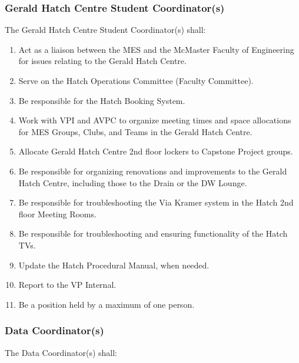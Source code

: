 \hypertarget{gerald-hatch-centre-student-coordinators}{%
 \subsubsection{Gerald Hatch Centre Student
  Coordinator(s)}
 \label{gerald-hatch-centre-student-coordinators}}
The Gerald Hatch Centre Student Coordinator(s) shall:

\begin{enumerate}
 \item
  Act as a liaison between the MES and the McMaster Faculty of
  Engineering for issues relating to the Gerald Hatch Centre.
 \item
  Serve on the Hatch Operations Committee (Faculty Committee).
 \item
  Be responsible for the Hatch Booking System.
 \item
  Work with VPI and AVPC to organize meeting times and space allocations
  for MES Groups, Clubs, and Teams in the Gerald Hatch Centre.
 \item
  Allocate Gerald Hatch Centre 2nd floor lockers to Capstone Project
  groups.
 \item
  Be responsible for organizing renovations and improvements to the
  Gerald Hatch Centre, including those to the Drain or the DW Lounge.
 \item
  Be responsible for troubleshooting the Via Kramer system in the Hatch
  2nd floor Meeting Rooms.
 \item
  Be responsible for troubleshooting and ensuring functionality of the
  Hatch TVs.
 \item
  Update the Hatch Procedural Manual, when needed.
 \item
  Report to the VP Internal.
 \item
  Be a position held by a maximum of one person.

\end{enumerate}

\hypertarget{data-coordinators}{%
 \subsubsection{Data Coordinator(s)}
 \label{data-coordinators}}
The Data Coordinator(s) shall:

